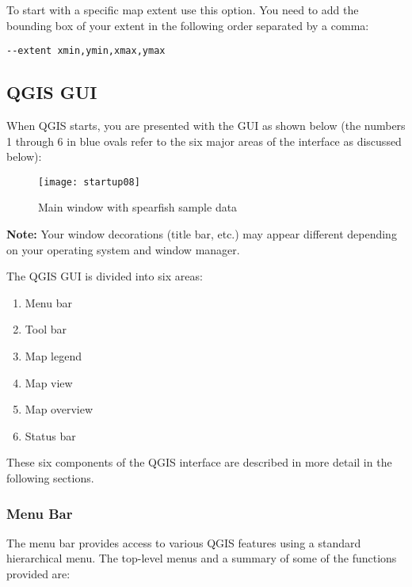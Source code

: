 To start with a specific map extent use this option. You need to add the bounding
box of your extent in the following order separated by a comma:
\begin{verbatim}
--extent xmin,ymin,xmax,ymax
\end{verbatim}


\subsection{QGIS GUI}
\label{label_qgismainwindow}

When QGIS starts, you are presented with the GUI as shown below
(the numbers 1 through 6 in blue ovals refer to the six major areas of the
interface as discussed below):

\begin{figure}[ht]
   \begin{center}
   \caption{Main window with spearfish sample data}\label{fig:startup}
   \texttt{[image: startup08]}
\end{center} 
\end{figure}

\textbf{Note:} Your window decorations (title bar, etc.) may appear
different depending on your operating system and window manager.

The QGIS GUI is divided into six areas:

\begin{enumerate}
\item Menu bar
\item Tool bar
\item Map legend
\item Map view
\item Map overview
\item Status bar
\end{enumerate}

These six components of the QGIS interface are described in more detail in
the following sections.

\subsubsection{Menu Bar}\label{label_menubar}

The menu bar provides access to various QGIS features using a standard 
hierarchical menu. The top-level menus and a summary of some of the
functions provided are:

